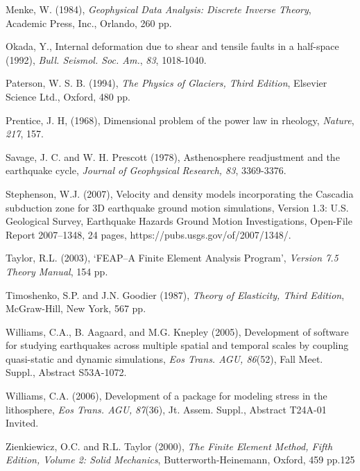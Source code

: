 \documentclass{pylithdoc}
\begin{document}
\begin{thebibliography}{Bibliography}
Menke, W. (1984), \textit{Geophysical
  Data Analysis: Discrete Inverse Theory}, Academic Press, Inc.,
  Orlando, 260 pp.

Okada, Y., Internal deformation due
  to shear and tensile faults in a half-space (1992), \textit{Bull.
    Seismol. Soc. Am.}, \textit{83}, 1018-1040.

Paterson, W. S. B. (1994),
  \textit{The Physics of Glaciers, Third Edition}, Elsevier Science
  Ltd., Oxford, 480 pp.

Prentice, J. H, (1968),
  Dimensional problem of the power law in rheology, \textit{Nature},
  \textit{217}, 157.

Savage,
  J. C. and W. H. Prescott (1978), Asthenosphere readjustment and the
  earthquake cycle, \textit{Journal of Geophysical}
  \textit{Research}\emph{, 83}, 3369-3376.

Stephenson, W.J. (2007),
  Velocity and density models incorporating the Cascadia subduction
  zone for 3D earthquake ground motion simulations, Version 1.3:
  U.S. Geological Survey, Earthquake Hazards Ground Motion
  Investigations, Open-File Report 2007–1348, 24 pages,
  https://pubs.usgs.gov/of/2007/1348/.

Taylor, R.L. (2003), `FEAP--A
  Finite Element Analysis Program', \textit{Version 7.5 Theory
    Manual}, 154 pp.

Timoshenko, S.P. and J.N. Goodier
  (1987), \textit{Theory of Elasticity, Third Edition}, McGraw-Hill,
  New York, 567 pp.

Williams, C.A.,
  B. Aagaard, and M.G. Knepley (2005), Development of software for
  studying earthquakes across multiple spatial and temporal scales by
  coupling quasi-static and dynamic simulations, \emph{Eos Trans. AGU,
    86}(52), Fall Meet. Suppl., Abstract S53A-1072.

Williams, C.A. (2006),
  Development of a package for modeling stress in the lithosphere,
  \emph{Eos Trans.  AGU,} \emph{87}(36), Jt. Assem. Suppl., Abstract
  T24A-01 Invited.

Zienkiewicz, O.C. and R.L. Taylor
  (2000), \textit{The Finite Element Method, Fifth Edition, Volume 2:
  Solid Mechanics}, Butterworth-Heinemann, Oxford, 459 pp.125


\end{thebibliography}
\end{document}
